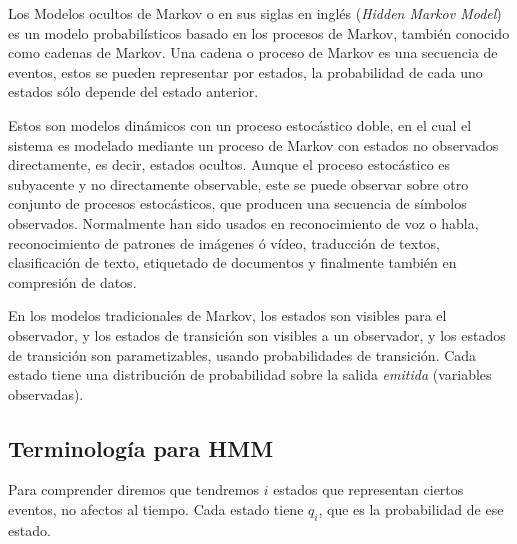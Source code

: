 


Los Modelos ocultos de Markov o en sus siglas en inglés \HMM (\emph{Hidden Markov Model})  es un modelo probabilísticos basado en los procesos de Markov, también conocido como cadenas de Markov. Una cadena o proceso de Markov es una secuencia de eventos, estos se pueden representar por estados, la probabilidad de cada uno estados sólo depende del estado anterior.


Estos \HMM son modelos dinámicos con un proceso estocástico doble, en el cual el sistema es modelado mediante un proceso de Markov con estados no observados directamente, es decir, estados ocultos. Aunque el proceso estocástico es subyacente y no directamente observable, este se puede observar sobre otro conjunto de procesos estocásticos, que producen una secuencia de símbolos observados. Normalmente han sido usados en reconocimiento de voz o habla, reconocimiento de patrones de imágenes ó vídeo, traducción de textos, clasificación de texto, etiquetado de documentos y finalmente también en compresión de datos.

En los modelos tradicionales de Markov, los estados son visibles para el observador, y los estados de transición son visibles a un observador, y los estados de transición son parametizables, usando probabilidades de transición. Cada estado tiene una distribución de probabilidad sobre la salida \emph{emitida} (variables observadas).




\subsection{Terminología para HMM}

Para comprender diremos que tendremos $i$ estados que representan ciertos eventos, no afectos al tiempo. Cada estado tiene $q_{i}$, que es la probabilidad de ese estado.

